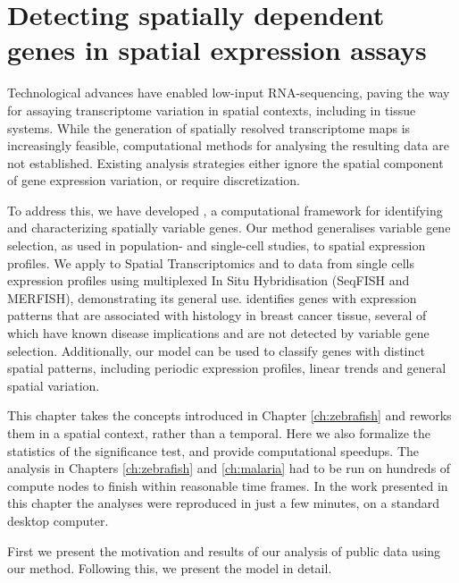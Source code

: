 
\chapter{Detecting spatially dependent genes in spatial expression assays} \label{ch:spatial}

\graphicspath{{Chapter5/Figs/}}

Technological advances have enabled low-input RNA-sequencing, paving the way for assaying transcriptome variation in spatial contexts, including in tissue systems. While the generation of spatially resolved transcriptome maps is increasingly feasible, computational methods for analysing the resulting data are not established. Existing analysis strategies either ignore the spatial component of gene expression variation, or require discretization.

To address this, we have developed , a computational framework for identifying and characterizing spatially variable genes. Our method generalises variable gene selection, as used in population- and single-cell studies, to spatial expression profiles. We apply  to Spatial Transcriptomics and to data from single cells expression profiles using multiplexed In Situ Hybridisation (SeqFISH and MERFISH), demonstrating its general use.  identifies genes with expression patterns that are associated with histology in breast cancer tissue, several of which have known disease implications and are not detected by variable gene selection. Additionally, our model can be used to classify genes with distinct spatial patterns, including periodic expression profiles, linear trends and general spatial variation.

This chapter takes the concepts introduced in Chapter \ref{ch:zebrafish} and reworks them in a spatial context, rather than a temporal. Here we also formalize the statistics of the significance test, and provide computational speedups. The analysis in Chapters \ref{ch:zebrafish} and \ref{ch:malaria} had to be run on hundreds of compute nodes to finish within reasonable time frames. In the work presented in this chapter the analyses were reproduced in just a few minutes, on a standard desktop computer.

First we present the motivation and results of our analysis of public data using our method. Following this, we present the model in detail.

